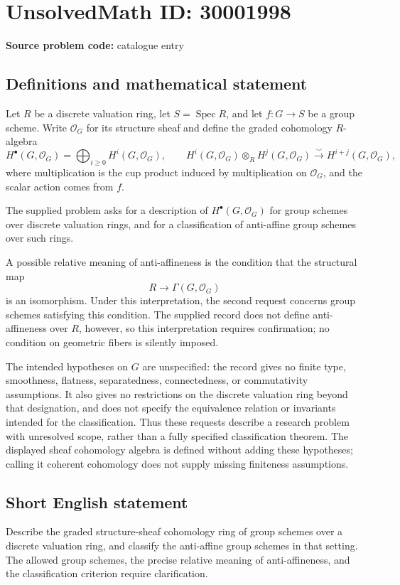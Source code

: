 \documentclass[11pt]{article}
\begin{document}
\section*{UnsolvedMath ID: 30001998}
\textbf{Source problem code:} catalogue entry
\subsection{Definitions and mathematical statement}
Let \(R\) be a discrete valuation ring, let \(S=\operatorname{Spec}R\), and let \(f\colon G\to S\) be a group scheme. Write \(\mathcal O_G\) for its structure sheaf and define the graded cohomology \(R\)-algebra
\[
H^\bullet(G,\mathcal O_G)=\bigoplus_{i\geq 0}H^i(G,\mathcal O_G),
\qquad
H^i(G,\mathcal O_G)\otimes_R H^j(G,\mathcal O_G)\xrightarrow{\smile}H^{i+j}(G,\mathcal O_G),
\]
where multiplication is the cup product induced by multiplication on \(\mathcal O_G\), and the scalar action comes from \(f\).

The supplied problem asks for a description of \(H^\bullet(G,\mathcal O_G)\) for group schemes over discrete valuation rings, and for a classification of anti-affine group schemes over such rings.

A possible relative meaning of anti-affineness is the condition that the structural map
\[
R\longrightarrow\Gamma(G,\mathcal O_G)
\]
is an isomorphism. Under this interpretation, the second request concerns group schemes satisfying this condition. The supplied record does not define anti-affineness over \(R\), however, so this interpretation requires confirmation; no condition on geometric fibers is silently imposed.

The intended hypotheses on \(G\) are unspecified: the record gives no finite type, smoothness, flatness, separatedness, connectedness, or commutativity assumptions. It also gives no restrictions on the discrete valuation ring beyond that designation, and does not specify the equivalence relation or invariants intended for the classification. Thus these requests describe a research problem with unresolved scope, rather than a fully specified classification theorem. The displayed sheaf cohomology algebra is defined without adding these hypotheses; calling it coherent cohomology does not supply missing finiteness assumptions.
\subsection{Short English statement}
Describe the graded structure-sheaf cohomology ring of group schemes over a discrete valuation ring, and classify the anti-affine group schemes in that setting. The allowed group schemes, the precise relative meaning of anti-affineness, and the classification criterion require clarification.
\end{document}
